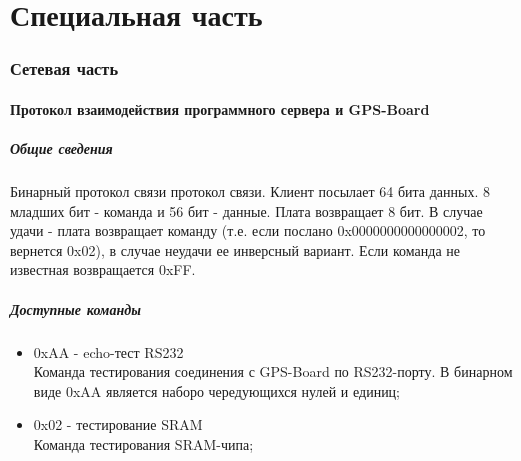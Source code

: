 \part{Специальная часть}

\section{Сетевая часть}


\subsection{Протокол взаимодействия программного сервера и GPS-Board}
\subsubsection{Общие сведения}
Бинарный протокол связи протокол связи. Клиент посылает 64 бита данных. 8 младших бит - команда и 56 бит - данные. Плата возвращает 8 бит. В случае
удачи - плата возвращает команду (т.е. если послано 0x0000000000000002, то вернется 0x02), в случае неудачи ее инверсный вариант. Если команда не известная
возвращается 0xFF.

\subsubsection{Доступные команды}
\begin{itemize}
\item 0xAA - echo-тест RS232 \\
Команда тестирования соединения с GPS-Board по RS232-порту. В бинарном виде 0xAA является наборо чередующихся нулей и единиц;
\item 0x02 - тестирование SRAM \\ 
Команда тестирования SRAM-чипа;
\end{itemize}

